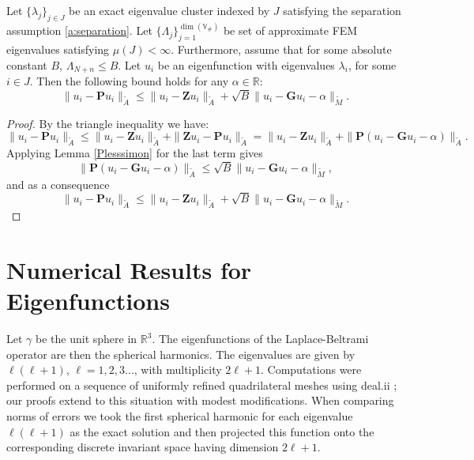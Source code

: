 \documentclass{siamart0516}
\newcommand{\bG}{\ensuremath{\boldsymbol G}}
\newcommand{\bP}{\ensuremath{\boldsymbol P}}
\newcommand{\bZ}{\ensuremath{\boldsymbol Z}}
\numberwithin{equation}{section}
\numberwithin{theorem}{section}
\numberwithin{figure}{section}
\begin{document}
\begin{proposition}
\label{prop:equiv}
Let $\{\lambda_j\}_{j\in J}$ be an exact eigenvalue cluster indexed by $J$  satisfying the separation assumption \eqref{a:separation}. Let $\{\Lambda_{j}\}_{j=1}^{\dim (\mathbb{V}_\#)}$ be set of approximate FEM eigenvalues satisfying $\mu(J)<\infty$.
Furthermore, assume that for some absolute constant $B$, $\Lambda_{N+n} \leq B.$
Let $u_i$ be an eigenfunction with eigenvalues $\lambda_i$, for some $i \in J$. 
Then the following bound holds for any $\alpha \in \mathbb{R}$:
$$
\|u_i-\bP u_i\|_{\widetilde A} \leq \|u_i-\bZ u_i\|_{\widetilde A} + \sqrt{B}\|u_i-  \bG u_i-\alpha\|_{\widetilde M}.
$$
\end{proposition}

\begin{proof}
By the triangle inequality we have:
$$
\|u_i-\bP u_i\|_{\widetilde A} \leq \|u_i-\bZ u_i\|_{\widetilde A} + \|\bZ u_i- \bP u_i \|_{\widetilde A} =\|u_i-\bZ u_i\|_{\widetilde A} + \|\bP (u_i-  \bG u_i-\alpha) \|_{\widetilde A}. 
$$
Applying Lemma \ref{Plesssimon} for the last term gives
$$
\|\bP (u_i-  \bG u_i-\alpha) \|_{\widetilde A}\leq  \sqrt{B} \|u_i-  \bG u_i-\alpha\|_{\widetilde M},
$$
and as a consequence
$$
\|u_i-\bP u_i\|_{\widetilde A} \leq\|u_i-\bZ u_i\|_{\widetilde A} + \sqrt{B}\|u_i-  \bG u_i-\alpha\|_{\widetilde M}.
$$
\end{proof}




\section{Numerical Results for Eigenfunctions} \label{sec5}
Let $\gamma$ be the unit sphere in $\mathbb{R}^3$. The eigenfunctions of the Laplace-Beltrami operator are then the spherical harmonics.  The eigenvalues are given by $\ell(\ell+1)$, $\ell=1,2,3...$, with multiplicity $2 \ell+1$.  Computations were performed on a sequence of uniformly refined quadrilateral meshes using deal.ii \cite{BHK:07}; our proofs extend to this situation with modest modifications.  
When comparing norms of errors we took the first spherical harmonic for each eigenvalue $\ell(\ell+1)$ as the exact solution and then projected this function onto the corresponding discrete invariant space having dimension $2\ell+1$.  
\end{document}
